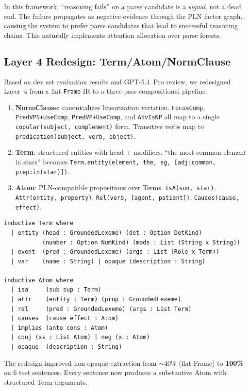 \documentclass[]{article}
\newcommand{\code}[1]{\texttt{#1}}
\begin{document}
In this framework, ``reasoning fails'' on a parse candidate is
a \emph{signal}, not a dead end. The failure propagates as negative
evidence through the PLN factor graph, causing the system to
prefer parse candidates that lead to successful reasoning chains.
This naturally implements attention allocation over parse forests.

\subsection{Layer 4 Redesign: Term/Atom/NormClause}

Based on dev set evaluation results and GPT-5.4~Pro review, we
redesigned Layer~4 from a flat \code{Frame} IR to a three-pass
compositional pipeline:

\begin{enumerate}
\item \textbf{NormClause}: canonicalizes linearization variation.
  \code{FocusComp}, \code{PredVPS+UseComp}, \code{PredVP+UseComp},
  and \code{AdvIsNP} all map to a single \code{copular(subject, complement)}
  form. Transitive verbs map to \code{predication(subject, verb, object)}.

\item \textbf{Term}: structured entities with head + modifiers.
  ``the most common element in stars'' becomes
  \code{Term.entity(element, the, sg, [adj:common, prep:in(star)])}.

\item \textbf{Atom}: PLN-compatible propositions over Terms.
  \code{IsA(sun, star)}, \code{Attr(entity, property)},
  \code{Rel(verb, [agent, patient])}, \code{Causes(cause, effect)}.
\end{enumerate}

\begin{lstlisting}[language={}]
inductive Term where
  | entity (head : GroundedLexeme) (det : Option DetKind)
           (number : Option NumKind) (mods : List (String x String))
  | event  (pred : GroundedLexeme) (args : List (Role x Term))
  | var    (name : String) | opaque (description : String)

inductive Atom where
  | isa     (sub sup : Term)
  | attr    (entity : Term) (prop : GroundedLexeme)
  | rel     (pred : GroundedLexeme) (args : List Term)
  | causes  (cause effect : Atom)
  | implies (ante cons : Atom)
  | conj (xs : List Atom) | neg (x : Atom)
  | opaque  (description : String)
\end{lstlisting}

The redesign improved non-opaque extraction from $\sim$40\% (flat Frame)
to \textbf{100\%} on 6 test sentences. Every sentence now produces a
substantive Atom with structured Term arguments.
\end{document}
